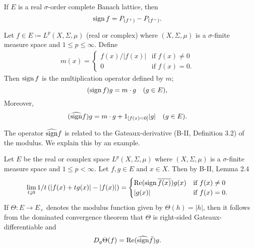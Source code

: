 If $E$ is a real $\sigma$-order complete Banach lattice, then
\begin{equation}\label{eq:c2-2.5}
	\operatorname{sign} f = P_{(f^{+})} - P_{(f^{-})}  .
\end{equation}
\begin{example}\label{ex:c2-2.2}
Let $f \in E \coloneqq L^p(X,\Sigma,\mu)$ (real or complex) where $(X,\Sigma,\mu)$ is a $\sigma$-finite measure space and $1 \leq p \leq \infty$.
Define
\begin{align*}
	m(x) = 
	\begin{cases}
    	f(x)/|f(x)| & \text{if } f(x) \neq 0 \\
    	0 & \text{if } f(x) = 0  .
	\end{cases}
\end{align*}
Then $\operatorname{sign} f$ is the multiplication operator defined by $m$; \ie
\[
	(\operatorname{sign} f)g = m \cdot g \quad (g \in E), 
\]
Moreover, 
\[
	(\widehat{\operatorname{sign}} f)g = m \cdot g + 1_{[f(x)=0]}|g| \quad (g \in E).
\]
\end{example}
The operator $\widehat{\operatorname{sign}} f$ is related to the Gateaux-derivative (B-II, Definition 3.2) of the modulus.
We explain this by an example.
\begin{example}\label{ex:c2-2.3}
Let $E$ be the real or complex space $L^p(X,\Sigma,\mu)$ where $(X,\Sigma,\mu)$ is a $\sigma$-finite measure space and $1 \leq p < \infty$.
Let $f,g \in E$ and $x \in X$.
Then by B-II, Lemma 2.4 
\begin{align*}
\lim_{t \downarrow 0} 1/t\, (|f(x)+tg(x)|-|f(x)|) = 
\begin{cases}
    \mathop{}\!\mathrm{Re} (\operatorname{sign} \overline{f(x)})g(x) & \text{if } f(x) \neq 0 \\
    |g(x)| & \text{if } f(x) = 0.
\end{cases}
\end{align*}
If $\Theta \colon E \to E_{+}$ denotes the modulus function given by $\Theta(h) = |h|$, then it follows from the dominated convergence theorem that $\Theta$ is right-sided Gateaux-differentiable and
\begin{equation}\label{eq:c2-2.6}
D_{g}\Theta(f) = \mathop{}\!\mathrm{Re}(\widehat{\operatorname{sign}} \bar{f})g.
\end{equation}
\end{example}
